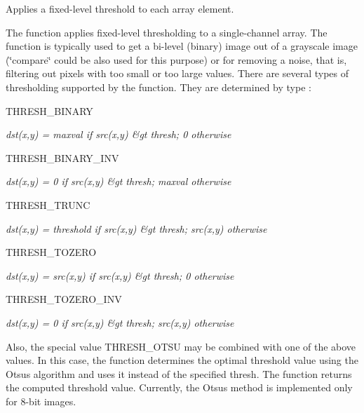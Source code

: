 Applies a fixed-\/level threshold to each array element.

The function applies fixed-\/level thresholding to a single-\/channel array. The function is typically used to get a bi-\/level (binary) image out of a grayscale image (\char`\"{}compare\char`\"{} could be also used for this purpose) or for removing a noise, that is, filtering out pixels with too small or too large values. There are several types of thresholding supported by the function. They are determined by {\ttfamily type} \+:


\begin{DoxyItemize}
\item T\+H\+R\+E\+S\+H\+\_\+\+B\+I\+N\+A\+RY 
\end{DoxyItemize}

{\itshape dst(x,y) = maxval if src(x,y) \&gt thresh; 0 otherwise}


\begin{DoxyItemize}
\item T\+H\+R\+E\+S\+H\+\_\+\+B\+I\+N\+A\+R\+Y\+\_\+\+I\+NV 
\end{DoxyItemize}

{\itshape dst(x,y) = 0 if src(x,y) \&gt thresh; maxval otherwise}


\begin{DoxyItemize}
\item T\+H\+R\+E\+S\+H\+\_\+\+T\+R\+U\+NC 
\end{DoxyItemize}

{\itshape dst(x,y) = threshold if src(x,y) \&gt thresh; src(x,y) otherwise}


\begin{DoxyItemize}
\item T\+H\+R\+E\+S\+H\+\_\+\+T\+O\+Z\+E\+RO 
\end{DoxyItemize}

{\itshape dst(x,y) = src(x,y) if src(x,y) \&gt thresh; 0 otherwise}


\begin{DoxyItemize}
\item T\+H\+R\+E\+S\+H\+\_\+\+T\+O\+Z\+E\+R\+O\+\_\+\+I\+NV 
\end{DoxyItemize}

{\itshape dst(x,y) = 0 if src(x,y) \&gt thresh; src(x,y) otherwise}

Also, the special value {\ttfamily T\+H\+R\+E\+S\+H\+\_\+\+O\+T\+SU} may be combined with one of the above values. In this case, the function determines the optimal threshold value using the Otsu\textquotesingle{}s algorithm and uses it instead of the specified {\ttfamily thresh}. The function returns the computed threshold value. Currently, the Otsu\textquotesingle{}s method is implemented only for 8-\/bit images.


